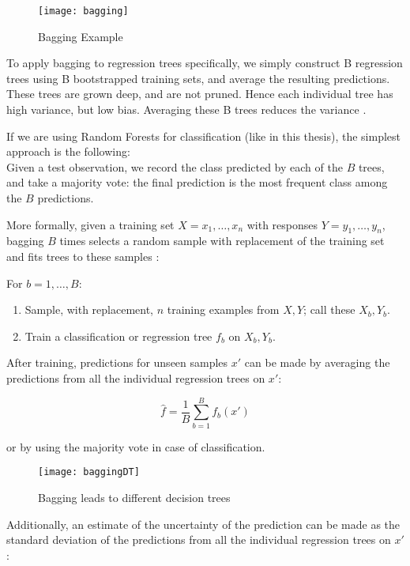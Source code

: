 \begin{figure}[H]
	\centering
	\texttt{[image: bagging]}
	\caption{Bagging Example \cite{bagging}}
	\label{fig:bagging}
\end{figure}

To apply bagging to regression trees specifically, we simply construct B regression trees using B bootstrapped training sets, and average the resulting predictions. These trees are grown deep, and are not pruned. Hence each individual tree has high variance, but low bias. Averaging these B trees reduces the variance \cite{ISLR}.

If we are using Random Forests for classification (like in this thesis), the simplest approach is the following: \\
Given a test observation, we record the class predicted by each of the $B$ trees, and take a majority vote: the final prediction is the most frequent class among the $B$ predictions.

More formally, given a training set $X = x_1, \dots, x_n$ with responses $Y = y_1, \dots, y_n$, bagging $B$ times selects a random sample with replacement of the training set and fits trees to these samples \cite{wiki:randomforest}:

For $b = 1, \dots, B$:
\begin{enumerate}[noitemsep]
	\item Sample, with replacement, $n$ training examples from $X, Y$; call these $X_b, Y_b$.
	\item Train a classification or regression tree $f_b$ on $X_b, Y_b$.
\end{enumerate}

After training, predictions for unseen samples $x'$ can be made by averaging the predictions from all the individual regression trees on $x'$:

\begin{equation}
{{\hat {f}}={\frac {1}{B}}\sum _{b=1}^{B}f_{b}(x')}
\end{equation}

or by using the majority vote in case of classification.

\begin{figure}[H]
	\centering
	\texttt{[image: baggingDT]}
	\caption{Bagging leads to different decision trees \cite{baggingDT}}
	\label{fig:baggingDT}
\end{figure}

Additionally, an estimate of the uncertainty of the prediction can be made as the standard deviation of the predictions from all the individual regression trees on $x'$:

